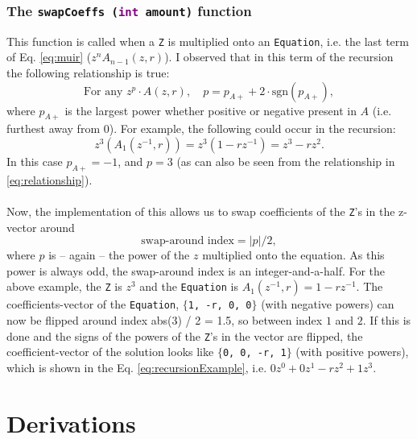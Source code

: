 \documentclass[dvipsnames]{article}
\def\type[#1]{\textcolor{purple}{#1}}
\begin{document}
\subsubsection{The \texttt{swapCoeffs (\type[int] amount)} function}
This function is called when a \texttt{Z} is multiplied onto an \texttt{Equation}, i.e. the last term of Eq. \eqref{eq:muir} ($z^nA_{n-1}(z,r)$). I observed that in this term of the recursion the following relationship is true:
\begin{equation}\label{eq:relationship}
    \text{For any } z^p\cdot A(z,r), \quad  p = p_{A+} + 2\cdot\text{sgn}(p_{A+}),
\end{equation}
where $p_{A+}$ is the largest  power whether positive or negative present in $A$ (i.e. furthest away from 0). For example, the following could occur in the recursion:
\begin{equation}\label{eq:recursionExample}
    z^3 (A_1(z^{-1}, r)) = z^3(1 - rz^{-1}) = z^3 - rz^2.
\end{equation}
In this case $p_{A+} = -1$, and $p = 3$ (as can also be seen from the relationship in \eqref{eq:relationship}).
\\
\\
\noindent Now, the implementation of this allows us to swap coefficients of the \texttt{Z}'s in the z-vector around
\begin{equation}
\text{swap-around index} = |p| / 2,
\end{equation}
where $p$ is -- again -- the power of the $z$ multiplied onto the equation. As this power is always odd, the swap-around index is an integer-and-a-half. For the above example, the \texttt{Z} is $z^3$ and the \texttt{Equation} is $A_1(z^{-1},r) = 1-rz^{-1}$. The coefficients-vector of the \texttt{Equation}, \texttt{$\{$1, -r, 0, 0$\}$} (with negative powers) can now be flipped around index abs(3) / 2 = 1.5, so between index $1$ and $2$. If this is done and the signs of the powers of the \texttt{Z}'s in the vector are flipped, the coefficient-vector of the solution looks like \texttt{$\{$0, 0, -r, 1$\}$} (with positive powers), which is shown in the Eq. \eqref{eq:recursionExample}, i.e. $0z^0+0z^1-rz^2+1z^3$.
     


\appendix
\def\Psinplp{\Psi_{l+1}^{n+1}}
\def\Psinmlp{\Psi_{l+1}^{n-1}}

\section{Derivations}
\end{document}
